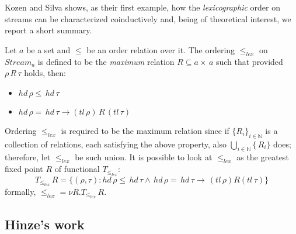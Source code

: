Kozen and Silva shows, as their first example, how the \emph{lexicographic} order
on streams can be characterized coinductively and, being of theoretical interest,
we report a short summary.

Let $a$ be a set and $\leq$ be an order relation over it. The ordering $\leq_{lex}$
on $Stream_{a}$ is defined to be the \emph{maximum} relation $R\subseteq a\times\,a$ 
such that provided $\rho\,R\,\tau$ holds, then:
\begin{itemize}
    \item $hd\,\rho\leq\,hd\,\tau$ 
    \item $hd\,\rho=\,hd\,\tau \rightarrow (tl\,\rho)\,R\,(tl\,\tau)$ 
\end{itemize}
Ordering $\leq_{lex}$ is required to be the maximum relation since if 
$\lbrace R_{i}\rbrace_{i\in\mathbb{N}}$ is a collection of relations, each satisfying the above
property, also $\bigcup_{i\in\mathbb{N}}\lbrace\,R_{i}\rbrace$ does; therefore, let $\leq_{lex}$
be such union. It is possible to look at $\leq_{lex}$ as the greatest fixed point $R$
of functional $T_{\leq_{lex}}$:
\begin{displaymath}
    T_{\leq_{lex}}\,R = \lbrace (\rho,\tau) : hd\,\rho \leq\,hd\,\tau\wedge\,
        hd\,\rho=\,hd\,\tau\rightarrow\,(tl\,\rho) R (tl\,\tau) \rbrace
\end{displaymath}
formally, $\leq_{lex} = \nu R. T_{\leq_{lex}}\,R$.

\subsection{Hinze's work}

